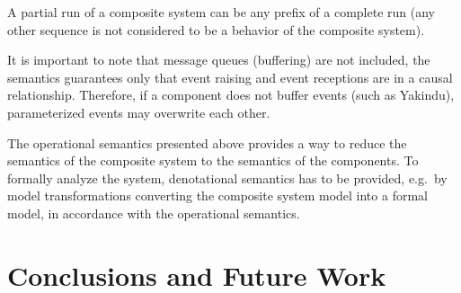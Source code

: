 \documentclass[conference]{IEEEtran}
\newcommand{\Yakindu}{\textsf{Yakindu}}
\begin{document}
A partial run of a composite system can be any prefix of a complete run (any other sequence is not considered to be a behavior of the composite system).

It is important to note that message queues (buffering) are not included, the semantics guarantees only that event raising and event receptions are in a causal relationship. Therefore, if a component does not buffer events (such as \Yakindu), parameterized events may overwrite each other.

The operational semantics presented above provides a way to reduce the semantics of the composite system to the semantics of the components. To formally analyze the system, denotational semantics has to be provided, e.g.~by model transformations converting the composite system model into a formal model, in accordance with the operational semantics.



\section{Conclusions and Future Work}
\label{sec:conclusion}
\end{document}
